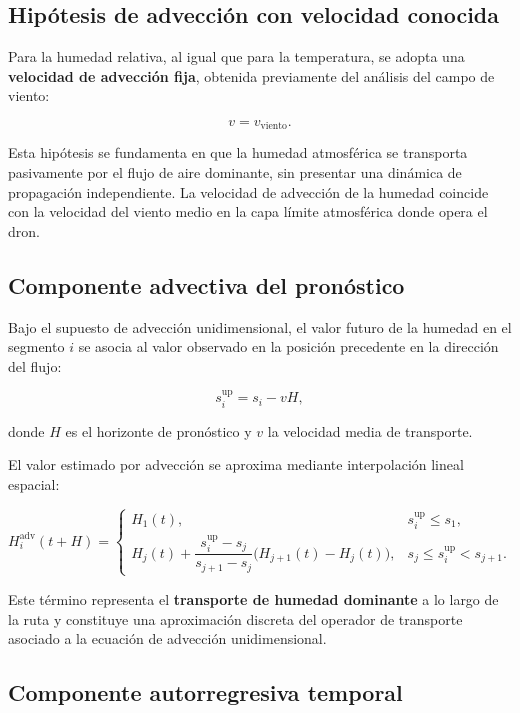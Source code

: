 \documentclass[
  spanish,
  us-letterpaper,
]{scrreprt}
\numberwithin{equation}{section}
\begin{document}
\subsection{Hipótesis de advección con velocidad
conocida}\label{hipuxf3tesis-de-advecciuxf3n-con-velocidad-conocida-1}

Para la humedad relativa, al igual que para la temperatura, se adopta
una \textbf{velocidad de advección fija}, obtenida previamente del
análisis del campo de viento:

\[
v = v_{\text{viento}}.
\]

Esta hipótesis se fundamenta en que la humedad atmosférica se transporta
pasivamente por el flujo de aire dominante, sin presentar una dinámica
de propagación independiente. La velocidad de advección de la humedad
coincide con la velocidad del viento medio en la capa límite atmosférica
donde opera el dron.

\subsection{Componente advectiva del
pronóstico}\label{componente-advectiva-del-pronuxf3stico-1}

Bajo el supuesto de advección unidimensional, el valor futuro de la
humedad en el segmento \(i\) se asocia al valor observado en la posición
precedente en la dirección del flujo:

\[
s_i^{\text{up}} = s_i - vH,
\]

donde \(H\) es el horizonte de pronóstico y \(v\) la velocidad media de
transporte.

El valor estimado por advección se aproxima mediante interpolación
lineal espacial:

\[
H_i^{\text{adv}}(t+H) =
\begin{cases}
H_1(t), & s_i^{\text{up}} \le s_1, \\[6pt]
H_j(t) + \dfrac{s_i^{\text{up}} - s_j}{s_{j+1}-s_j}\bigl(H_{j+1}(t)-H_j(t)\bigr), & s_j \le s_i^{\text{up}} < s_{j+1}.
\end{cases}
\]

Este término representa el \textbf{transporte de humedad dominante} a lo
largo de la ruta y constituye una aproximación discreta del operador de
transporte asociado a la ecuación de advección unidimensional.

\subsection{Componente autorregresiva
temporal}\label{componente-autorregresiva-temporal-2}
\end{document}
